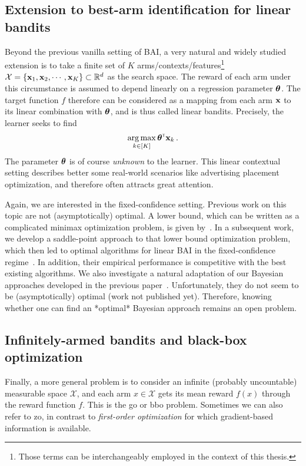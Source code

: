 \subsection{Extension to best-arm identification for linear bandits}

Beyond the previous vanilla setting of BAI, a very natural and widely studied extension is to take a finite set of $K$ arms/contexts/features\footnote{Those terms can be interchangeably employed in the context of this thesis.} $\mathcal{X}=\{{\bf x}_1,{\bf x}_2,\cdots,{\bf x}_K\}\subset\mathbb{R}^d$ as the search space. The reward of each arm under this circumstance is assumed to depend linearly on a \gls{regression parameter} ${\boldsymbol \theta}$. The target function $f$ therefore can be considered as a mapping from each arm ${\bf x}$ to its linear combination with ${\boldsymbol \theta}$, and is thus called linear bandits. Precisely, the learner seeks to find
\begin{align}\label{eq:optim_linbai}
    \operatorname*{arg\,max}_{k\in[K]} {\boldsymbol \theta}^{\mathsf{\scriptscriptstyle T}}{\bf x}_k\,.
\end{align}
The parameter ${\boldsymbol \theta}$ is of course \emph{unknown} to the learner. This linear contextual setting describes better some real-world scenarios like advertising placement optimization, and therefore often attracts great attention.

Again, we are interested in the fixed-confidence setting. Previous work on this topic are not (asymptotically) optimal. A lower bound, which can be written as a complicated minimax optimization problem, is given by~\cite{garivier2016tracknstop}. In a subsequent work, we develop a saddle-point approach to that lower bound optimization problem, which then led to optimal algorithms for linear BAI in the fixed-confidence regime~\citep{degenne2020game}. In addition, their empirical performance is competitive with the best existing algorithms. We also investigate a natural adaptation of our Bayesian approaches developed in the previous paper~\citep{shang2020t3c}. Unfortunately, they do not seem to be (asymptotically) optimal (work not published yet). Therefore, knowing whether one can find an *optimal* Bayesian approach remains an open problem.

\subsection{Infinitely-armed bandits and black-box optimization}

Finally, a more general problem is to consider an infinite (probably uncountable) measurable space $\mathcal{X}$, and each arm $x\in\mathcal{X}$ gets its mean reward $f(x)$ through the reward function $f$. This is the \gls{go} or \gls{bbo} problem. Sometimes we can also refer to \gls{zo}, in contrast to \emph{first-order optimization} for which gradient-based information is available.

